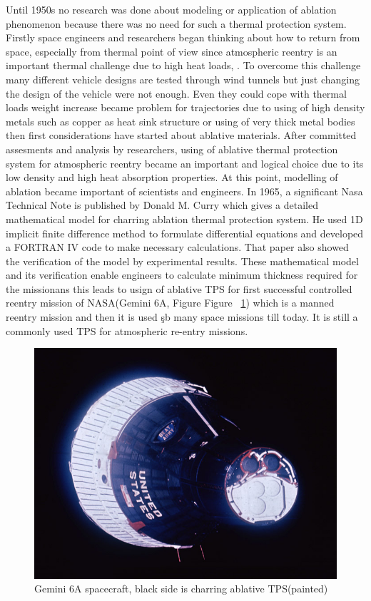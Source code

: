 \documentclass[a4paper, 12pt]{article} %
\begin{document}
Until 1950s no research was done about modeling or application of ablation phenomenon because there was no need for such a thermal protection system. Firstly space engineers and researchers began thinking about how to return from space, especially from thermal point of view since atmospheric reentry is an important thermal challenge due to high heat loads, . To overcome this challenge many different vehicle designs are tested through wind tunnels but just changing the design of the vehicle were not enough. Even they could cope with thermal loads weight increase became problem for trajectories due to using of high density metals such as copper as heat sink structure or using of very thick metal bodies then first considerations have started about ablative materials\cite{bian}. After committed assesments and analysis by researchers, using of ablative thermal protection system for atmospheric reentry became an important and logical choice due to its low density and high heat absorption properties. At this point, modelling of ablation became important of scientists and engineers. In 1965, a significant Nasa Technical Note is published by Donald M. Curry which gives a detailed mathematical model for charring ablation thermal protection system\cite{cury}. He used 1D implicit finite difference method to formulate differential equations and developed a FORTRAN IV code to make necessary calculations. That paper also showed the verification of the model by experimental results. These mathematical model and its verification enable engineers to calculate minimum thickness required for the missionans this leads to usign of ablative TPS for first successful controlled reentry mission of NASA\cite{Gemini}(Gemini 6A, Figure Figure ~\ref{fig:gemini}) which is a manned reentry mission and then it is used şb many space missions till today. It is still a commonly used TPS for atmospheric re-entry missions.\newline

\begin{figure}[h!]
  \centering
  \includegraphics[width=0.8 \linewidth]{gemini_6.jpg}
  \caption{Gemini 6A spacecraft, black side is charring ablative TPS(painted)}
  \label{fig:gemini}
\end{figure}
\end{document}
